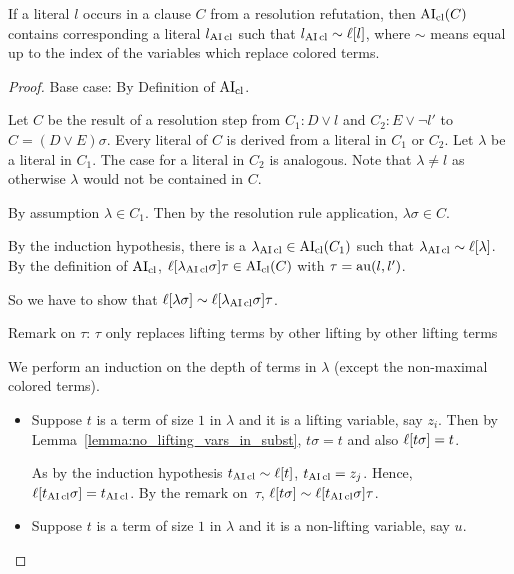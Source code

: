 \documentclass[,%
	paper=a4,%
	DIV12, %
	twoside=false,%
	liststotoc,
	bibtotoc,
	draft=false,%
	numbers=noendperiod
]{scrartcl}
\begin{document}
\begin{lemma} 
	\label{lemma:literal_in_clause_similar}
	If a literal $l$ occurs in a clause $C$ from a resolution refutation,
	then $\operatorname{AI}_\mathrm{cl}(C)$ contains corresponding a literal $l_{\operatorname{AI}\mathrm{cl}}$ such that $l_{\operatorname{AI}\mathrm{cl}} \sim \ell[l]$, where $\sim$ means equal up to the index of the variables which replace colored terms.
\end{lemma}
\begin{proof}
	Base case: By Definition of $\operatorname{AI}_\mathrm{cl}$.

	Let $C$ be the result of a resolution step from $C_1: D\lor l$ and $C_2: E\lor \lnot l'$ to $C = (D \lor E)\sigma$.
	Every literal of $C$ is derived from a literal in $C_1$ or $C_2$. Let $\lambda$ be a literal in $C_1$. The case for a literal in $C_2$ is analogous.
	Note that $\lambda \neq l$ as otherwise $\lambda$ would not be contained in $C$.

	By assumption $\lambda \in C_1$. Then by the resolution rule application, $\lambda\sigma \in C$.

	\newcommand{\lclOne}{\lambda\cl}
	By the induction hypothesis, there is a $\lclOne \in \AIclause(C_1)$ such that $\lclOne \sim \lifboth{\lambda}$.
	By the definition of $\operatorname{AI}_\mathrm{cl}$, $\lifboth{\lclOne\sigma}\tau \in \AIclause(C)$ 
	with $\tau = \operatorname{au}(l, l')$.

	So we have to show that $\ell[ \lambda \sigma ]  \sim \ell[\lambda_{\operatorname{AI}\mathrm{cl}}\sigma]\tau$.

	Remark on $\tau$: $\tau$ only replaces lifting terms by other lifting by other lifting terms

				We perform an induction on the depth of terms in $\lambda$ (except the non-maximal colored terms).
	\begin{itemize}
			\item Suppose $t$ is a term of size $1$ in $\lambda$ and it is a lifting variable, say $z_i$.
				Then by Lemma~\ref{lemma:no_lifting_vars_in_subst}, $t\sigma = t$ and also $\ell[t\sigma] = t$.

				As by the induction hypothesis $t_{\operatorname{AI}\mathrm{cl}} \sim \ell[t]$, $t_{\operatorname{AI}\mathrm{cl}} =z_j$.
				Hence, $\ell[t_{\operatorname{AI}\mathrm{cl}}\sigma] = t_{\operatorname{AI}\mathrm{cl}}$.
				By the remark on~$\tau$,
				$\ell[t\sigma] \sim \ell[t_{\operatorname{AI}\mathrm{cl}}\sigma]\tau$.

			\item Suppose $t$ is a term of size $1$ in $\lambda$ and it is a non-lifting variable, say $u$.


\end{itemize}
\end{proof}
\end{document}
